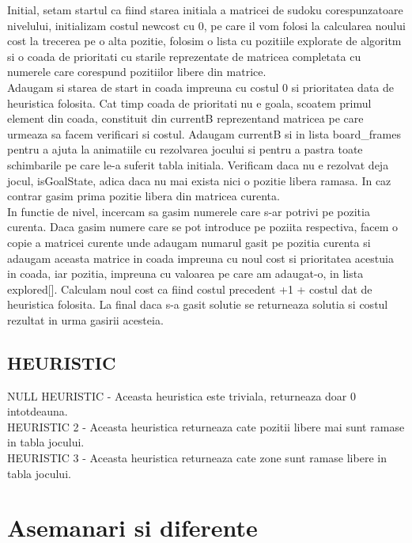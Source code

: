 \documentclass[a4paper,18pt]{article}
\begin{document}
\tab Initial, setam startul ca fiind starea initiala a matricei de sudoku corespunzatoare nivelului, initializam costul newcost cu 0, pe care il vom folosi la calcularea noului cost la trecerea pe o alta pozitie, folosim o lista cu pozitiile explorate de algoritm si o coada de prioritati cu starile reprezentate de matricea completata cu numerele care corespund pozitiilor libere din matrice. 
\newline
\\ \indent Adaugam si starea de start in coada impreuna cu costul 0 si prioritatea data de heuristica folosita. Cat timp coada de prioritati nu e goala, scoatem primul element din coada, constituit din currentB reprezentand matricea pe care urmeaza sa facem verificari si costul. Adaugam currentB si in lista board\_frames pentru a ajuta la animatiile cu rezolvarea jocului si pentru a pastra toate schimbarile pe care le-a suferit tabla initiala. Verificam daca nu e rezolvat deja jocul, isGoalState, adica daca nu mai exista nici o pozitie libera ramasa. In caz contrar gasim prima pozitie libera din matricea curenta. 
\newline
\\ \indent In functie de nivel, incercam sa gasim numerele care s-ar potrivi pe pozitia curenta. Daca gasim numere care se pot introduce pe poziita respectiva, facem o copie a matricei curente unde adaugam numarul gasit pe pozitia curenta si adaugam aceasta matrice in coada impreuna cu noul cost si prioritatea acestuia in coada, iar pozitia, impreuna cu valoarea pe care am adaugat-o, in lista explored[]. Calculam noul cost ca fiind costul precedent +1 + costul dat de heuristica folosita. La final daca s-a gasit solutie se returneaza solutia si costul rezultat in urma gasirii acesteia.

\subsection{HEURISTIC }

\tab NULL HEURISTIC - Aceasta heuristica este triviala, returneaza doar 0 intotdeauna. \newline 
\\ \indent HEURISTIC 2 - Aceasta heuristica returneaza cate pozitii libere mai sunt ramase in tabla jocului. \newline 
\\ \indent HEURISTIC 3 - Aceasta heuristica returneaza cate zone sunt ramase libere in tabla jocului. 

\section{ Asemanari si diferente}
\end{document}
